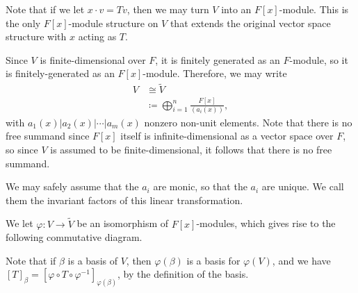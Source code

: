 \documentclass[10pt]{mypackage}
\renewcommand{\coloneq}{\coloneqq}
\begin{document}
Note that if we let $x\cdot v = Tv$, then we may turn $V$ into an $F[x]$-module. This is the only $F[x]$-module structure on $V$ that extends the original vector space structure with $x$ acting as $T$.

Since $V$ is finite-dimensional over $F$, it is finitely generated as an $F$-module, so it is finitely-generated as an $F[x]$-module. Therefore, we may write
\begin{align*}
  V &\cong \widetilde{V}\\
  &\coloneq \bigoplus_{i=1}^{n} \frac{F[x]}{\left( a_i(x) \right)},
\end{align*}
with $a_1(x) | a_2(x) | \cdots | a_m(x)$ nonzero non-unit elements. Note that there is no free summand since $F[x]$ itself is infinite-dimensional as a vector space over $F$, so since $V$ is assumed to be finite-dimensional, it follows that there is no free summand.

We may safely assume that the $a_i$ are monic, so that the $a_i$ are unique. We call them the invariant factors of this linear transformation.

We let $\varphi\colon V\rightarrow \widetilde{V}$ be an isomorphism of $F[x]$-modules, which gives rise to the following commutative diagram.
\begin{center}
\end{center}
Note that if $\beta$ is a basis of $V$, then $\varphi\left(\beta\right)$ is a basis for $\varphi(V)$, and we have $\left[ T \right]_{\beta} = \left[ \varphi\circ T \circ \varphi^{-1} \right]_{\varphi(\beta)}$, by the definition of the basis.
\end{document}
